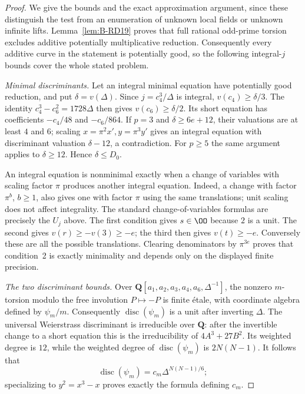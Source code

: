 \begin{proof}
We give the bounds and the exact approximation argument, since these distinguish the test from an enumeration of unknown local fields or unknown infinite lifts.
Lemma~\ref{lem:B-RD19} proves that full rational odd-prime torsion excludes additive potentially multiplicative reduction.  Consequently every additive curve in the statement is potentially good, so the following integral-$j$ bounds cover the whole stated problem.

\emph{Minimal discriminants.}
Let an integral minimal equation have potentially good reduction, and put $\delta=v(\Delta)$.  Since $j=c_4^3/\Delta$ is integral, $v(c_4)\geq\delta/3$.  The identity $c_4^3-c_6^2=1728\Delta$ then gives $v(c_6)\geq\delta/2$.  Its short equation has coefficients $-c_4/48$ and $-c_6/864$.  If $p=3$ and $\delta\geq6e+12$, their valuations are at least $4$ and $6$; scaling $x=\pi^2x',y=\pi^3y'$ gives an integral equation with discriminant valuation $\delta-12$, a contradiction.  For $p\geq5$ the same argument applies to $\delta\geq12$.  Hence $\delta\leq D_0$.

An integral equation is nonminimal exactly when a change of variables with scaling factor $\pi$ produces another integral equation.  Indeed, a change with factor $\pi^b$, $b\geq1$, also gives one with factor $\pi$ using the same translations; unit scaling does not affect integrality.  The standard change-of-variables formulas are precisely the $U_j$ above.  The first condition gives $s\in\OO$ because $2$ is a unit.  The second gives $v(r)\geq-v(3)\geq-e$; the third then gives $v(t)\geq-e$.  Conversely these are all the possible translations.  Clearing denominators by $\pi^{3e}$ proves that condition~2 is exactly minimality and depends only on the displayed finite precision.

\emph{The two discriminant bounds.}
Over $\mathbf Q[a_1,a_2,a_3,a_4,a_6,\Delta^{-1}]$, the nonzero $m$-torsion modulo the free involution $P\mapsto-P$ is finite \'etale, with coordinate algebra defined by $\psi_m/m$.  Consequently $\operatorname{disc}(\psi_m)$ is a unit after inverting $\Delta$.  The universal Weierstrass discriminant is irreducible over $\mathbf Q$: after the invertible change to a short equation this is the irreducibility of $4A^3+27B^2$.  Its weighted degree is $12$, while the weighted degree of $\operatorname{disc}(\psi_m)$ is $2N(N-1)$.  It follows that
\[
           \operatorname{disc}(\psi_m)=c_m\Delta^{N(N-1)/6};
\]
specializing to $y^2=x^3-x$ proves exactly the formula defining $c_m$.


\end{proof}
